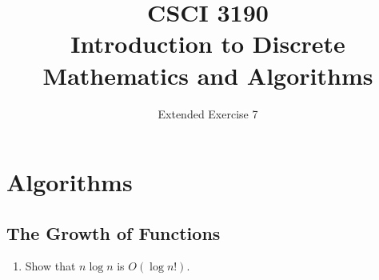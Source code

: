 \documentclass{../../cls/sig-alternate-05-2015}
\begin{document}






%

\title{CSCI 3190 \\ Introduction to Discrete Mathematics and Algorithms}
\subtitle{Extended Exercise 7}

\maketitle
\begin{abstract}

\end{abstract}

\keywords{}

\section{Algorithms}
\subsection{The Growth of Functions}
\begin{enumerate}
\item Show that $n \log n$ is $O(\log n!)$.
\end{enumerate}
\end{document}
